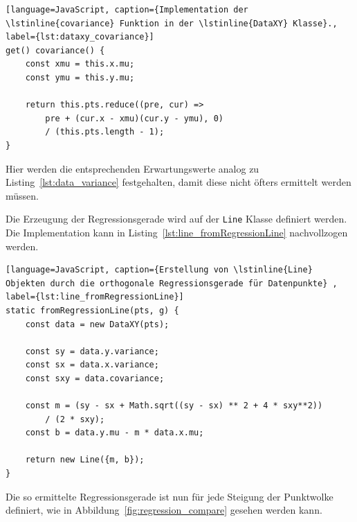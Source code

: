 \begin{lstlisting}[language=JavaScript, caption={Implementation der \lstinline{covariance} Funktion in der \lstinline{DataXY} Klasse}., label={lst:dataxy_covariance}]
get() covariance() {
    const xmu = this.x.mu;
    const ymu = this.y.mu;

    return this.pts.reduce((pre, cur) =>
        pre + (cur.x - xmu)(cur.y - ymu), 0)
        / (this.pts.length - 1);
}
\end{lstlisting}

Hier werden die entsprechenden Erwartungswerte analog zu Listing~\ref{lst:data_variance} festgehalten, damit diese nicht öfters ermittelt werden müssen.

Die Erzeugung der Regressionsgerade wird auf der \lstinline{Line} Klasse definiert werden.
Die Implementation kann in Listing~\ref{lst:line_fromRegressionLine} nachvollzogen werden.

\begin{lstlisting}[language=JavaScript, caption={Erstellung von \lstinline{Line} Objekten durch die orthogonale Regressionsgerade für Datenpunkte} , label={lst:line_fromRegressionLine}]
static fromRegressionLine(pts, g) {
    const data = new DataXY(pts);

    const sy = data.y.variance;
    const sx = data.x.variance;
    const sxy = data.covariance;

    const m = (sy - sx + Math.sqrt((sy - sx) ** 2 + 4 * sxy**2)) 
        / (2 * sxy);
    const b = data.y.mu - m * data.x.mu;

    return new Line({m, b});
}
\end{lstlisting}

Die so ermittelte Regressionsgerade ist nun für jede Steigung der Punktwolke definiert, wie in Abbildung~\ref{fig:regression_compare} gesehen werden kann.

